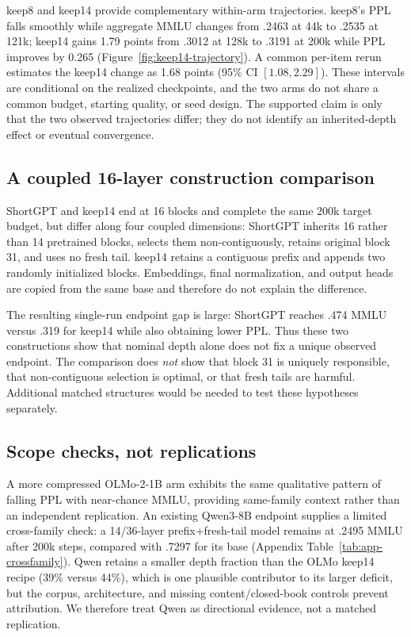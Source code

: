 keep8 and keep14 provide complementary within-arm trajectories. keep8's PPL
falls smoothly while aggregate MMLU changes from .2463 at 44k to .2535 at 121k;
keep14 gains 1.79 points from .3012 at 128k to .3191 at 200k while PPL improves
by 0.265 (Figure~\ref{fig:keep14-trajectory}). A common per-item rerun estimates
the keep14 change as 1.68 points (95\% CI $[1.08,2.29]$). These intervals are
conditional on the realized checkpoints, and the two arms do not share a common
budget, starting quality, or seed design. The supported claim is only that the
two observed trajectories differ; they do not identify an inherited-depth
effect or eventual convergence.

\subsection{A coupled 16-layer construction comparison}


ShortGPT and keep14 end at 16 blocks and complete the same 200k target budget,
but differ along four coupled dimensions: ShortGPT inherits 16 rather than 14
pretrained blocks, selects them non-contiguously, retains original block 31, and
uses no fresh tail. keep14 retains a contiguous prefix and appends two randomly
initialized blocks. Embeddings, final normalization, and output heads are copied
from the same base and therefore do not explain the difference.

The resulting single-run endpoint gap is large: ShortGPT reaches .474 MMLU
versus .319 for keep14 while also obtaining lower PPL. Thus these two
constructions show that nominal depth alone does not fix a unique observed
endpoint. The comparison does \emph{not} show
that block 31 is uniquely responsible, that non-contiguous selection is optimal,
or that fresh tails are harmful. Additional matched structures would be needed
to test these hypotheses separately.

\subsection{Scope checks, not replications}
A more compressed OLMo-2-1B arm exhibits the same qualitative pattern of falling
PPL with near-chance MMLU, providing same-family context rather than an
independent replication. An existing Qwen3-8B endpoint supplies a limited
cross-family check: a 14/36-layer prefix+fresh-tail model remains at .2495 MMLU
after 200k steps, compared with .7297 for its base (Appendix
Table~\ref{tab:app-crossfamily}). Qwen retains a smaller depth fraction than the
OLMo keep14 recipe (39\% versus 44\%), which is one plausible contributor to its
larger deficit, but the corpus, architecture, and missing content/closed-book
controls prevent attribution. We therefore treat Qwen as directional evidence,
not a matched replication.
